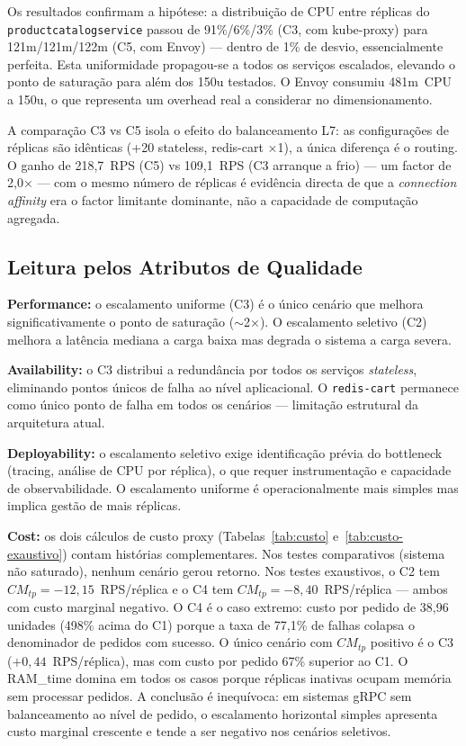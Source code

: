 \documentclass[acmsmall,screen=true,nonacm]{acmart}
\begin{document}
Os resultados confirmam a hipótese: a distribuição de CPU entre réplicas do \texttt{productcatalogservice} passou de 91\%/6\%/3\% (C3, com kube-proxy) para 121m/121m/122m (C5, com Envoy) — dentro de 1\% de desvio, essencialmente perfeita. Esta uniformidade propagou-se a todos os serviços escalados, elevando o ponto de saturação para além dos 150u testados. O Envoy consumiu 481m~CPU a 150u, o que representa um overhead real a considerar no dimensionamento.

A comparação C3 vs C5 isola o efeito do balanceamento L7: as configurações de réplicas são idênticas (+20 stateless, redis-cart ×1), a única diferença é o routing. O ganho de 218,7~RPS (C5) vs 109,1~RPS (C3 arranque a frio) — um factor de 2,0× — com o mesmo número de réplicas é evidência directa de que a \textit{connection affinity} era o factor limitante dominante, não a capacidade de computação agregada.

\subsection{Leitura pelos Atributos de Qualidade}

\textbf{Performance:} o escalamento uniforme (C3) é o único cenário que melhora significativamente o ponto de saturação ($\sim$2$\times$). O escalamento seletivo (C2) melhora a latência mediana a carga baixa mas degrada o sistema a carga severa.

\textbf{Availability:} o C3 distribui a redundância por todos os serviços \textit{stateless}, eliminando pontos únicos de falha ao nível aplicacional. O \texttt{redis-cart} permanece como único ponto de falha em todos os cenários — limitação estrutural da arquitetura atual.

\textbf{Deployability:} o escalamento seletivo exige identificação prévia do bottleneck (tracing, análise de CPU por réplica), o que requer instrumentação e capacidade de observabilidade. O escalamento uniforme é operacionalmente mais simples mas implica gestão de mais réplicas.

\textbf{Cost:} os dois cálculos de custo proxy (Tabelas~\ref{tab:custo} e~\ref{tab:custo-exaustivo}) contam histórias complementares. Nos testes comparativos (sistema não saturado), nenhum cenário gerou retorno. Nos testes exaustivos, o C2 tem $CM_{tp}=-12{,}15$~RPS/réplica e o C4 tem $CM_{tp}=-8{,}40$~RPS/réplica — ambos com custo marginal negativo. O C4 é o caso extremo: custo por pedido de 38,96 unidades (498\% acima do C1) porque a taxa de 77,1\% de falhas colapsa o denominador de pedidos com sucesso. O único cenário com $CM_{tp}$ positivo é o C3 ($+0{,}44$~RPS/réplica), mas com custo por pedido 67\% superior ao C1. O RAM\_time domina em todos os casos porque réplicas inativas ocupam memória sem processar pedidos. A conclusão é inequívoca: em sistemas gRPC sem balanceamento ao nível de pedido, o escalamento horizontal simples apresenta custo marginal crescente e tende a ser negativo nos cenários seletivos.
\end{document}
